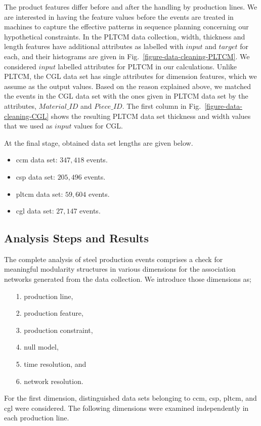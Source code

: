 


The product features differ before and after the handling by production lines. We are interested in having the feature values before the events are treated in machines to capture the effective patterns in sequence planning concerning our hypothetical constraints. In the PLTCM data collection, width, thickness and length features have additional attributes as labelled with $input$ and $target$ for each, and their histograms are given in Fig.~\ref{figure-data-cleaning-PLTCM}. We considered $input$ labelled attributes for PLTCM in our calculations. Unlike PLTCM, the CGL data set has single attributes for dimension features, which we assume as the output values. Based on the reason explained above, we matched the events in the CGL data set with the ones given in PLTCM data set by the attributes, $Material\_ID$ and $Piece\_ID$. The first column in Fig.~\ref{figure-data-cleaning-CGL} shows the resulting PLTCM data set thickness and width values that we used as $input$ values for CGL.

At the final stage, obtained data set lengths are given below.
\begin{itemize}
	\item \acs{ccm} data set: $347,418$ events.
	\item \acs{csp} data set: $205,496$ events.
	\item \acs{pltcm} data set: $59,604$ events.
	\item \acs{cgl} data set: $27,147$ events.
\end{itemize}

\subsection{Analysis Steps and Results}

The complete analysis of steel production events comprises a check for meaningful modularity structures in various dimensions for the association networks generated from the data collection. We introduce those dimensions as;
\begin{itemize}
	\item[1.] production line,
	\item[2.] production feature,
	\item[3.] production constraint,
	\item[4.] null model,
	\item[5.] time resolution, and
	\item[6.] network resolution.
\end{itemize} 
For the first dimension, distinguished data sets belonging to \acs{ccm}, \acs{csp}, \acs{pltcm}, and \acs{cgl} were considered. The following dimensions were examined independently in each production line.

